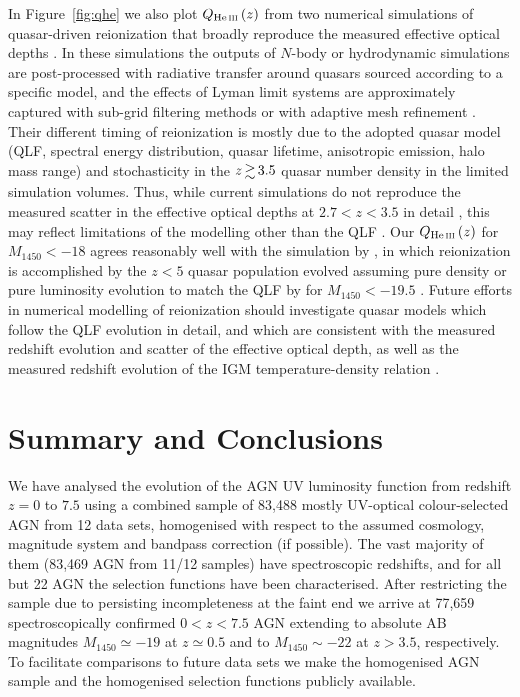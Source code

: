 \documentclass[fleqn,usenatbib]{mnras}
\begin{document}
In Figure~\ref{fig:qhe} we also plot $Q_\ion{He}{iii}\left(z\right)$
from two numerical simulations of quasar-driven 
reionization \citep{2009ApJ...694..842M,2014MNRAS.445.4186C} that
broadly reproduce the measured  effective optical depths
\citep{2016ApJ...825..144W}.  In these simulations the outputs of
$N$-body or hydrodynamic simulations are post-processed with radiative
transfer around quasars sourced according to a specific model, and the
effects of  Lyman limit systems are approximately captured
with sub-grid filtering methods \citep{2009ApJ...694..842M} or with
adaptive mesh refinement \citep{2014MNRAS.445.4186C}.  Their different
timing of  reionization is mostly due to the adopted
quasar model (QLF, spectral energy distribution, quasar lifetime,
anisotropic emission, halo mass range) and stochasticity in the $z\ga
3.5$ quasar number density in the limited simulation volumes.  Thus,
while current simulations do not reproduce the measured scatter in the
 effective optical depths at $2.7<z<3.5$ in detail
\citep{2016ApJ...825..144W}, this may reflect limitations of the
modelling other than the QLF \citep{2017MNRAS.468.4691D}.  Our
$Q_\ion{He}{iii}\left(z\right)$ for $M_{1450}<-18$ agrees reasonably
well with the simulation by \citet{2014MNRAS.445.4186C}, in which
 reionization is accomplished by the $z<5$ quasar
population evolved assuming pure density or pure luminosity evolution
to match the QLF by \citet{2011ApJ...728L..26G} for $M_{1450}<-19.5$
\citep[see also][]{2013MNRAS.435.3169C}.  Future efforts in numerical
modelling of  reionization should investigate quasar
models which follow the QLF evolution in detail, and which are
consistent with the measured redshift evolution and scatter of the
 effective optical depth, as well as the measured redshift
evolution of the IGM temperature-density relation
\citep[e.g.][]{2011MNRAS.410.1096B, 2014MNRAS.441.1916B,
  2018MNRAS.474.2871R, 2017arXiv171000700H}.


\section{Summary and Conclusions}
\label{sec:conc}

We have analysed the evolution of the AGN UV luminosity function from
redshift $z=0$ to $7.5$ using a combined sample of 83,488 mostly
UV-optical colour-selected AGN from 12 data sets, homogenised with
respect to the assumed cosmology, magnitude system and bandpass
correction (if possible).  The vast majority of them (83,469 AGN from
11/12 samples) have spectroscopic redshifts, and for all but 22 AGN
the selection functions have been characterised.  After restricting
the sample due to persisting incompleteness at the faint end we arrive
at 77,659 spectroscopically confirmed $0<z<7.5$ AGN extending to
absolute AB magnitudes $M_{1450}\simeq -19$ at $z\simeq 0.5$ and to
$M_{1450}\sim -22$ at $z>3.5$, respectively.  To facilitate
comparisons to future data sets we make the homogenised AGN sample and
the homogenised selection functions publicly available.
\end{document}
